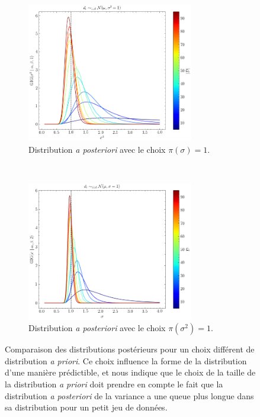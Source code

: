 \documentclass{article}
\numberwithin{equation}{section}
\begin{document}
\begin{figure}[H]
        \centering
        \begin{subfigure}{0.45\textwidth}
                \includegraphics[width=0.8\textwidth]{gig_1}
                \caption{Distribution \textit{a posteriori} avec le choix $\pi(\sigma) = 1$.}
                \label{fig:gig1}
        \end{subfigure}
        ~
        \begin{subfigure}{0.45\textwidth}
                \includegraphics[width=0.8\textwidth]{gig_2}
                \caption{Distribution \textit{a posteriori} avec le choix $\pi(\sigma^2) = 1$.}
                \label{fig:gig2}
        \end{subfigure}
        \caption{Comparaison des distributions postérieurs pour un choix différent de distribution \textit{a priori}. 
        Ce choix influence la forme de la distribution d'une manière prédictible, et nous indique que le choix 
de la taille de la distribution \textit{a priori} doit prendre en compte le fait que la distribution \textit{a posteriori} 
de la variance a une queue plus longue dans sa distribution pour un petit jeu de données.}
\end{figure}
\end{document}
